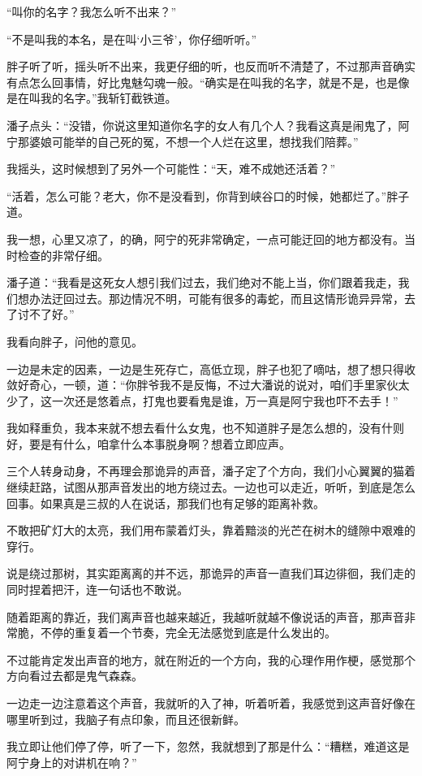 “叫你的名字？我怎么听不出来？”

“不是叫我的本名，是在叫‘小三爷’，你仔细听听。”

胖子听了听，摇头听不出来，我更仔细的听，也反而听不清楚了，不过那声音确实有点怎么回事情，好比鬼魅勾魂一般。“确实是在叫我的名字，就是不是，也是像是在叫我的名字。”我斩钉截铁道。

潘子点头：“没错，你说这里知道你名字的女人有几个人？我看这真是闹鬼了，阿宁那婆娘可能举的自己死的冤，不想一个人烂在这里，想找我们陪葬。”

我摇头，这时候想到了另外一个可能性：“天，难不成她还活着？”

“活着，怎么可能？老大，你不是没看到，你背到峡谷口的时候，她都烂了。”胖子道。

我一想，心里又凉了，的确，阿宁的死非常确定，一点可能迂回的地方都没有。当时检查的非常仔细。

潘子道：“我看是这死女人想引我们过去，我们绝对不能上当，你们跟着我走，我们想办法迂回过去。那边情况不明，可能有很多的毒蛇，而且这情形诡异异常，去了讨不了好。”

我看向胖子，问他的意见。

一边是未定的因素，一边是生死存亡，高低立现，胖子也犯了嘀咕，想了想只得收敛好奇心，一顿，道：“你胖爷我不是反悔，不过大潘说的说对，咱们手里家伙太少了，这一次还是悠着点，打鬼也要看鬼是谁，万一真是阿宁我也吓不去手！”

我如释重负，我本来就不想去看什么女鬼，也不知道胖子是怎么想的，没有什则好，要是有什么，咱拿什么本事脱身啊？想着立即应声。

三个人转身动身，不再理会那诡异的声音，潘子定了个方向，我们小心翼翼的猫着继续赶路，试图从那声音发出的地方绕过去。一边也可以走近，听听，到底是怎么回事。如果真是三叔的人在说话，那我们也有足够的距离补救。

不敢把矿灯大的太亮，我们用布蒙着灯头，靠着黯淡的光芒在树木的缝隙中艰难的穿行。

说是绕过那树，其实距离离的并不远，那诡异的声音一直我们耳边徘徊，我们走的同时捏着把汗，连一句话也不敢说。

随着距离的靠近，我们离声音也越来越近，我越听就越不像说话的声音，那声音非常脆，不停的重复着一个节奏，完全无法感觉到底是什么发出的。

不过能肯定发出声音的地方，就在附近的一个方向，我的心理作用作梗，感觉那个方向看过去都是鬼气森森。

一边走一边注意着这个声音，我就听的入了神，听着听着，我感觉到这声音好像在哪里听到过，我脑子有点印象，而且还很新鲜。

我立即让他们停了停，听了一下，忽然，我就想到了那是什么：“糟糕，难道这是阿宁身上的对讲机在响？”

